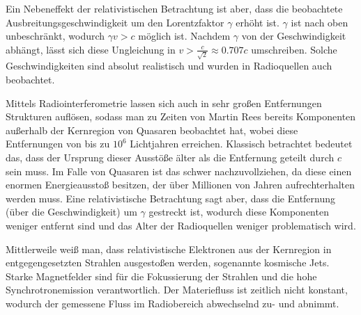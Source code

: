 Ein Nebeneffekt der relativistischen Betrachtung ist aber, dass die beobachtete Ausbreitungsgeschwindigkeit um den Lorentzfaktor \( \gamma \) erhöht ist. \( \gamma \) ist nach oben unbeschränkt, wodurch \( \gamma v > c \) möglich ist. Nachdem \( \gamma \) von der Geschwindigkeit abhängt, lässt sich diese Ungleichung in \( v > \tfrac{c}{\sqrt{2}} \approx 0.707c \) umschreiben. Solche Geschwindigkeiten sind absolut realistisch und wurden in Radioquellen auch beobachtet. 

Mittels Radiointerferometrie lassen sich auch in sehr großen Entfernungen Strukturen auflösen, sodass man zu Zeiten von Martin Rees bereits Komponenten außerhalb der Kernregion von Quasaren beobachtet hat, wobei diese Entfernungen von bis zu \( 10^6  \) Lichtjahren erreichen. Klassisch betrachtet bedeutet das, dass der Ursprung dieser Ausstöße älter als die Entfernung geteilt durch \( c \) sein muss. Im Falle von Quasaren ist das schwer nachzuvollziehen, da diese einen enormen Energieausstoß besitzen, der über Millionen von Jahren aufrechterhalten werden muss. Eine relativistische Betrachtung sagt aber, dass die Entfernung (über die Geschwindigkeit) um \( \gamma \) gestreckt ist, wodurch diese Komponenten weniger entfernt sind und das Alter der Radioquellen weniger problematisch wird.

Mittlerweile weiß man, dass relativistische Elektronen aus der Kernregion in entgegengesetzten Strahlen ausgestoßen werden, sogenannte kosmische Jets. Starke Magnetfelder sind für die Fokussierung der Strahlen und die hohe Synchrotronemission verantwortlich. Der Materiefluss ist zeitlich nicht konstant, wodurch der gemessene Fluss im Radiobereich abwechselnd zu- und abnimmt.  
